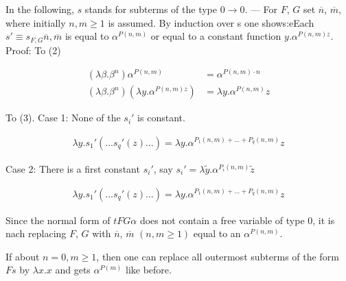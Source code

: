 \documentclass[11pt]{article}
\newcommand{\ga}{\alpha}
\newcommand{\gb}{\beta}
\newcommand{\gl}{\lambda}
\begin{document}
In the following, \(s\) stands for subterms of the type \(0 \rightarrow 0\). — For $F$, $G$ set $\overline{n}$, $\overline{m}$, where initially \(n, m \geq 1\) is assumed. By induction over s one shows:eEach \(s' \equiv s_{F, G} \overline{n}, \overline{m}\) is equal to \(\alpha^{P(n, m)}\) or equal to a constant function \(y. \alpha^{P(n, m) z}\). Proof: To (2)

\begin{align*} 
    (\gl \gb. \gb^n) \ga^{P(n, m)} &= \ga^{P(n, m) \cdot n}\\ 
    (\gl \gb. \gb^n) (\gl y. \ga^{P(n, m) z}) &= \gl y. \ga^{P(n, m)} z
\end{align*}

To (3). Case 1: None of the \(s_i'\) is constant.

\begin{align*}
    \gl y. s_1' (...s_q'(z)...) = \gl y. \ga^{P_1(n, m) + \dots + P_q(n, m)} z
\end{align*}

Case 2: There is a first constant \(s_i'\), say \(s_i' = \gl \tilde{y}. \ga^{P_i(n, m)} \tilde{z}\)

\begin{align*}
    \gl y. s_1' (...s_q'(z)...) = \gl y. \ga^{P_1(n, m) + \dots + P_q(n, m)} z
\end{align*}

Since the normal form of \(t F G \ga\) does not contain a free variable of type $0$, it is nach replacing $F$, $G$ with \(\overline{n}\), \(\overline{m}\) $(n,m \geq 1)$ equal to an \(\ga^{P(n, m)}\).

If about \(n = 0, m \geq 1\), then one can replace all outermost subterms of the form \(F s\) by \(\gl x. x\) and gets \(\ga^{P(m)}\) like before.
\end{document}
